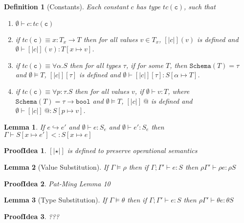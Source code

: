 \documentclass[10pt,a4paper]{article}
\makeatletter
\newtheorem{lemma}{Lemma}
\newtheorem{definition}{Definition}
\newtheorem*{proofIdea}{ProofIdea}
\newcommand\vref{\ensuremath{v}}
\newcommand\tref[2]{\ensuremath{\left\lbrace \vref : #1\mid #2\right\rbrace}}
\newcommand\tbbool{\ensuremath{\texttt{bool}}}
\newcommand\tc[1]{\ensuremath{tc\left(\texttt{#1}\right)}}
\newcommand\tfun[3]{\ensuremath{#1 : #2 \rightarrow #3}}
\newcommand\tpabs[3]{\ensuremath{\forall #1 : #2 . #3}}
\newcommand\ttabs[2]{\ensuremath{\forall #1 . #2}}
\newcommand\etapp[2]{\ensuremath{{#1} \left[ {#2}\right]}}
\newcommand\epapp[1]{\ensuremath{{#1} \ @}}
\newcommand\isWellFormed[2]{\ensuremath{{#1}\models {#2}}}
\newcommand\isSub[3]{\ensuremath{{#1}\vdash {#2}<:{#3}}}
\newcommand\hastype[3]{\ensuremath{{#1}\vdash {#2}:{#3}}}
\newcommand\eval[2]{\ensuremath{{#1}\hookrightarrow {#2}}}
\newcommand\hastypeEmp[2]{\hastype{\emptyset}{#1}{#2}}
\newcommand\sch[1]{\ensuremath{\texttt{Schema}\left(#1\right)}}
\newcommand\sub[2]{\ensuremath{\left[ #1 \mapsto #2 \right]}}
\makeatother
\begin{document}
\begin{definition}[Constants]
\label{DefConstants}
Each constant $c$ has type \tc{c}, such that
\begin{enumerate}
\item \hastypeEmp{c}{\tc{c}}
\item if $\tc{c} \equiv \tfun{x}{T_x}{T}$
	  then for all values $v \in T_x$, 
	  $[|c|](v)$ is defined and 
	  \hastypeEmp{[|c|](v)}{T\sub{x}{v}}.
\item if $\tc{c} \equiv \ttabs{\alpha}{S}$
	  then for all types $\tau$, 
	  if for some $T$, then 
	  $\sch{T} = \tau$ and \isWellFormed{\emptyset}{T}, 
	  $\etapp{[|c|]}{\tau}$ is defined and 
	  \hastypeEmp{\etapp{[|c|]}{\tau}}{S\sub{\alpha}{T}}.
\item if $\tc{c} \equiv \tpabs{p}{\tau}{S}$
	  then for all values $v$, 
	  if \hastypeEmp{v}{T}, where $\sch{T} = \tau \rightarrow \tbbool$ 
	  and \isWellFormed{\emptyset}{T}, 
	  $\epapp{[|c|]}$ is defined and 
	  \hastypeEmp{\epapp{[|c|]}}{S\sub{p}{v}}.
\end{enumerate}
\end{definition}

\begin{lemma}
\label{LemEvalSub}
If \eval{e}{e'} 
and \hastypeEmp{e}{S_e}
and \hastypeEmp{e'}{S_e}
then \isSub{\Gamma}{S\sub{x}{e'}}{S\sub{x}{e}}
\end{lemma}
\begin{proofIdea}
$[| \star|]$ is defined to preserve operational semantics
\end{proofIdea}


\begin{lemma}[Value Substitution]
\label{LemValueSub}
If \isWellFormed{\Gamma}{\rho} 
then if \hastype{\Gamma; \Gamma'}{e}{S}
then \hastype{\rho\Gamma'}{\rho e}{\rho S}
\end{lemma}
\begin{proofIdea}
Pat-Ming Lemma 10
\end{proofIdea}

\begin{lemma}[Type Substitution]
\label{LemTypeSub}
If \isWellFormed{\Gamma}{\theta} 
then if \hastype{\Gamma; \Gamma'}{e}{S}
then \hastype{\rho\Gamma'}{\theta e}{\theta S}
\end{lemma}
\begin{proofIdea}
???
\end{proofIdea}






\end{document}

